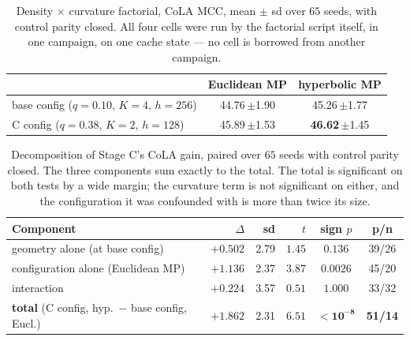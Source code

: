 \documentclass{article}
\begin{document}
\begin{table}[h]
\caption{Density $\times$ curvature factorial, CoLA MCC, mean $\pm$ sd over
$65$ seeds, with control parity closed. All four cells were run by the
factorial script itself, in one campaign, on one cache state --- no cell is
borrowed from another campaign.}
\label{tab:factorial}
\begin{center}
\small
\begin{tabular}{lcc}
\toprule
 & Euclidean MP & hyperbolic MP \\
\midrule
base config ($q{=}0.10$, $K{=}4$, $h{=}256$) & 44.76\,$\pm$1.90 & 45.26\,$\pm$1.77 \\
C config ($q{=}0.38$, $K{=}2$, $h{=}128$)    & 45.89\,$\pm$1.53 & \textbf{46.62}\,$\pm$1.45 \\
\bottomrule
\end{tabular}
\end{center}
\end{table}

\begin{table}[h]
\caption{Decomposition of Stage C's CoLA gain, paired over $65$ seeds with
control parity closed. The three components sum exactly to the total. The total
is significant on both tests by a wide margin; the curvature term is not
significant on either, and the configuration it was confounded with is more
than twice its size.}
\label{tab:decomp}
\begin{center}
\small
\begin{tabular}{lrrrcc}
\toprule
Component & $\Delta$ & sd & $t$ & sign $p$ & p/n \\
\midrule
geometry alone (at base config)    & $+0.502$ & 2.79 & $1.45$ & $0.136$ & 39/26 \\
configuration alone (Euclidean MP) & $+1.136$ & 2.37 & $3.87$ & $0.0026$ & 45/20 \\
interaction                        & $+0.224$ & 3.57 & $0.51$ & $1.000$ & 33/32 \\
\midrule
\textbf{total} (C config, hyp.\ $-$ base config, Eucl.)
                                   & $\mathbf{+1.862}$ & 2.31 & $\mathbf{6.51}$ & $\mathbf{<10^{-8}}$ & \textbf{51/14} \\
\bottomrule
\end{tabular}
\end{center}
\end{table}
\end{document}
